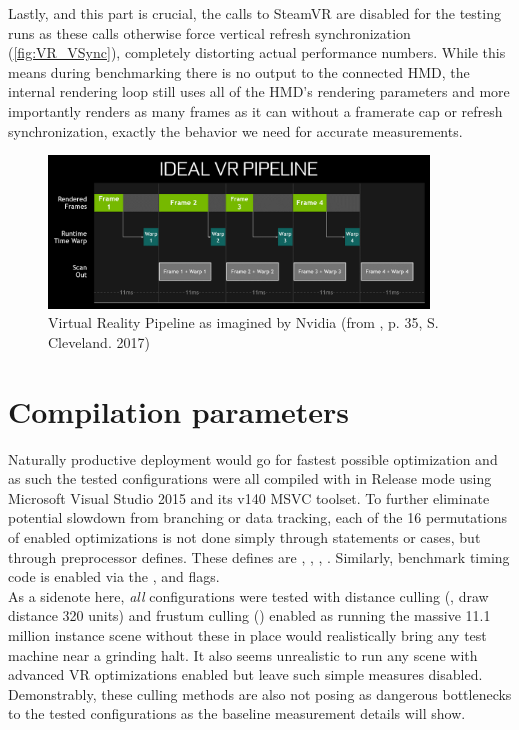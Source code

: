 Lastly, and this part is crucial, the  calls to SteamVR are disabled for the testing runs as these calls otherwise force vertical refresh synchronization (\autoref{fig:VR_VSync}), completely distorting actual performance numbers. While this means during benchmarking there is no output to the connected HMD, the internal rendering loop still uses all of the HMD's rendering parameters and more importantly renders as many frames as it can without a framerate cap or refresh synchronization, exactly the behavior we need for accurate measurements. 

\begin{figure}[htb]
  \centering
  \includegraphics[width=0.9\textwidth]{pictures/Nvidia_FCAT}
  \caption{Virtual Reality Pipeline as imagined by Nvidia (from \cite{Cleveland.2017}, p. 35, S. Cleveland. 2017)} \label{fig:VR_VSync}
\end{figure} 

\section{Compilation parameters}
Naturally productive deployment would go for fastest possible optimization and as such the tested configurations were all compiled with  in Release mode using Microsoft Visual Studio 2015 and its v140 MSVC toolset. 
To further eliminate potential slowdown from branching or data tracking, each of the 16 permutations of enabled optimizations is not done simply through  statements or  cases, but through preprocessor defines. These defines are , , , . Similarly, benchmark timing code is enabled via the ,  and  flags. \\
As a sidenote here, \textit{all} configurations were tested with distance culling (, draw distance 320 units) and frustum culling () enabled as running the massive 11.1 million instance scene without these in place would realistically bring any test machine near a grinding halt. It also seems unrealistic to run any scene with advanced VR optimizations enabled but leave such simple measures disabled. 
Demonstrably, these culling methods are also not posing as dangerous bottlenecks to the tested configurations as the baseline measurement details will show. 


